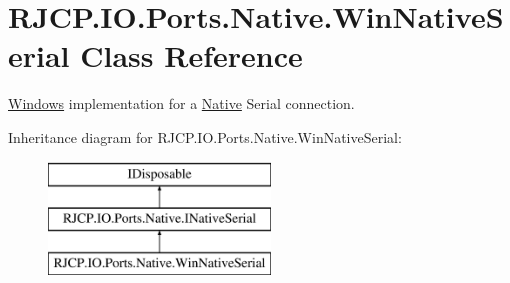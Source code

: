 \hypertarget{class_r_j_c_p_1_1_i_o_1_1_ports_1_1_native_1_1_win_native_serial}{}\section{R\+J\+C\+P.\+I\+O.\+Ports.\+Native.\+Win\+Native\+Serial Class Reference}
\label{class_r_j_c_p_1_1_i_o_1_1_ports_1_1_native_1_1_win_native_serial}


\mbox{\hyperlink{namespace_r_j_c_p_1_1_i_o_1_1_ports_1_1_native_1_1_windows}{Windows}} implementation for a \mbox{\hyperlink{namespace_r_j_c_p_1_1_i_o_1_1_ports_1_1_native}{Native}} Serial connection.  


Inheritance diagram for R\+J\+C\+P.\+I\+O.\+Ports.\+Native.\+Win\+Native\+Serial\+:\begin{figure}[H]
\begin{center}
\leavevmode
\includegraphics[height=3.000000cm]{class_r_j_c_p_1_1_i_o_1_1_ports_1_1_native_1_1_win_native_serial}
\end{center}
\end{figure}
